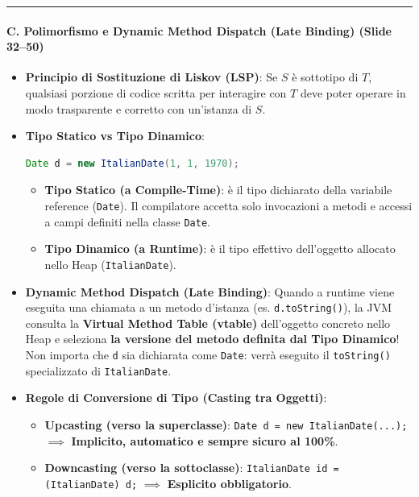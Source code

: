 \documentclass[11pt,a4paper]{article}
\newcommand{\passthrough}[1]{#1}
\providecommand{\tightlist}{\setlength{\itemsep}{0pt}\setlength{\parskip}{0pt}}
\begin{document}
\begin{center}\rule{0.5\linewidth}{0.5pt}\end{center}

\paragraph{C. Polimorfismo e Dynamic Method Dispatch (Late Binding)
(Slide
32--50)}\label{c.-polimorfismo-e-dynamic-method-dispatch-late-binding-slide-3250}

\begin{itemize}
\item
  \textbf{Principio di Sostituzione di Liskov (LSP)}: Se \(S\) è
  sottotipo di \(T\), qualsiasi porzione di codice scritta per
  interagire con \(T\) deve poter operare in modo trasparente e corretto
  con un'istanza di \(S\).
\item
  \textbf{Tipo Statico vs Tipo Dinamico}:

\begin{lstlisting}[language=Java]
Date d = new ItalianDate(1, 1, 1970);
\end{lstlisting}

  \begin{itemize}
  \tightlist
  \item
    \textbf{Tipo Statico (a Compile-Time)}: è il tipo dichiarato della
    variabile reference (\passthrough{\lstinline!Date!}). Il compilatore
    accetta solo invocazioni a metodi e accessi a campi definiti nella
    classe \passthrough{\lstinline!Date!}.
  \item
    \textbf{Tipo Dinamico (a Runtime)}: è il tipo effettivo dell'oggetto
    allocato nello Heap (\passthrough{\lstinline!ItalianDate!}).
  \end{itemize}
\item
  \textbf{Dynamic Method Dispatch (Late Binding)}: Quando a runtime
  viene eseguita una chiamata a un metodo d'istanza (es.
  \passthrough{\lstinline!d.toString()!}), la JVM consulta la
  \textbf{Virtual Method Table (vtable)} dell'oggetto concreto nello
  Heap e seleziona \textbf{la versione del metodo definita dal Tipo
  Dinamico}! Non importa che \passthrough{\lstinline!d!} sia dichiarata
  come \passthrough{\lstinline!Date!}: verrà eseguito il
  \passthrough{\lstinline!toString()!} specializzato di
  \passthrough{\lstinline!ItalianDate!}.
\item
  \textbf{Regole di Conversione di Tipo (Casting tra Oggetti)}:

  \begin{itemize}
  \item
    \textbf{Upcasting (verso la superclasse)}:
    \passthrough{\lstinline!Date d = new ItalianDate(...);!}
    \(\implies\) \textbf{Implicito, automatico e sempre sicuro al
    100\%}.
  \item
    \textbf{Downcasting (verso la sottoclasse)}:
    \passthrough{\lstinline!ItalianDate id = (ItalianDate) d;!}
    \(\implies\) \textbf{Esplicito obbligatorio}.


\end{itemize}
\end{itemize}
\end{document}
